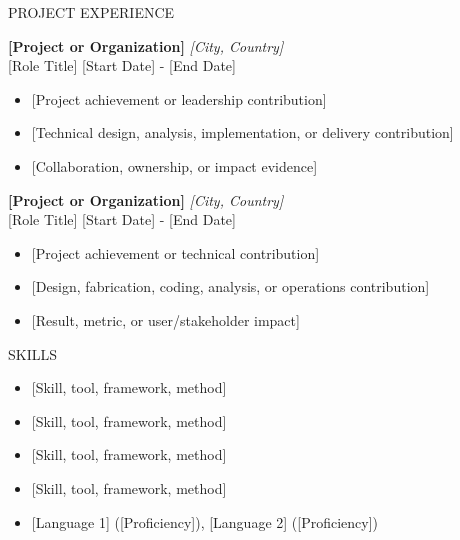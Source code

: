 \documentclass{resume} %
\begin{document}
\begin{rSection}{PROJECT EXPERIENCE}

\textbf{[Project or Organization]} \hfill \textit{[City, Country]}\\
{[Role Title]} \hfill [Start Date] - [End Date]

\vspace{-3pt}
 \begin{itemize}
 \itemsep -4pt {}
     \item{} [Project achievement or leadership contribution]
     \item{} [Technical design, analysis, implementation, or delivery contribution]
     \item{} [Collaboration, ownership, or impact evidence]
 \end{itemize}


\textbf{[Project or Organization]} \hfill \textit{[City, Country]}\\
{[Role Title]} \hfill [Start Date] - [End Date]

\vspace{-3pt}
 \begin{itemize}
 \itemsep -4pt {}
     \item{} [Project achievement or technical contribution]
\item{} [Design, fabrication, coding, analysis, or operations contribution]
\item{} [Result, metric, or user/stakeholder impact]
 \end{itemize}

\end{rSection}



\begin{rSection}{SKILLS}

\begin{itemize}
\itemsep -4pt {}
    \item{ [Skill, tool, framework, method]}
    \item{ [Skill, tool, framework, method]}
    \item{ [Skill, tool, framework, method]}
    \item{ [Skill, tool, framework, method]}
    \item{ [Language 1] ([Proficiency]), [Language 2] ([Proficiency])}
\end{itemize}

\end{rSection}
\end{document}
